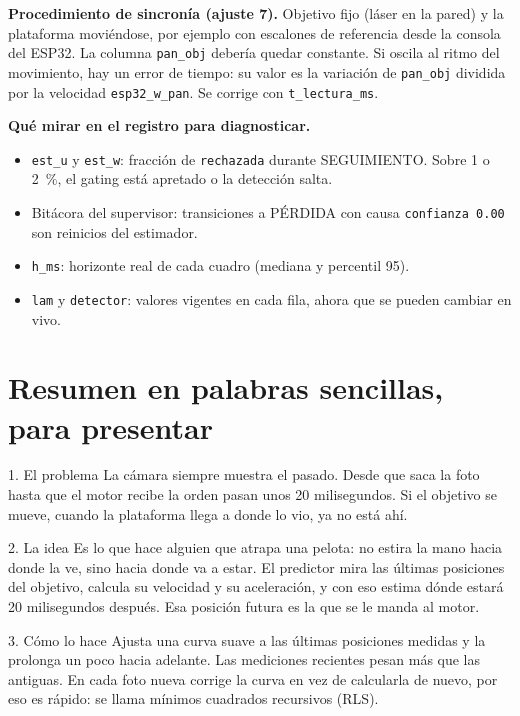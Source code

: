 \documentclass[11pt,a4paper]{article}
\newcommand{\cod}[1]{\texttt{#1}}
\begin{document}
\textbf{Procedimiento de sincronía (ajuste 7).} Objetivo fijo (láser en la pared) y la plataforma moviéndose,
por ejemplo con escalones de referencia desde la consola del ESP32. La columna \cod{pan\_obj} debería quedar
constante. Si oscila al ritmo del movimiento, hay un error de tiempo: su valor es la variación de
\cod{pan\_obj} dividida por la velocidad \cod{esp32\_w\_pan}. Se corrige con \cod{t\_lectura\_ms}.

\textbf{Qué mirar en el registro para diagnosticar.}
\begin{itemize}
  \item \cod{est\_u} y \cod{est\_w}: fracción de \cod{rechazada} durante SEGUIMIENTO. Sobre 1 o 2~\%, el gating
        está apretado o la detección salta.
  \item Bitácora del supervisor: transiciones a PÉRDIDA con causa \cod{confianza 0.00} son reinicios del estimador.
  \item \cod{h\_ms}: horizonte real de cada cuadro (mediana y percentil 95).
  \item \cod{lam} y \cod{detector}: valores vigentes en cada fila, ahora que se pueden cambiar en vivo.
\end{itemize}

\newpage
\section{Resumen en palabras sencillas, para presentar}

\begin{lamina}{1. El problema}
La cámara siempre muestra el pasado. Desde que saca la foto hasta que el motor recibe la orden pasan unos
20 milisegundos. Si el objetivo se mueve, cuando la plataforma llega a donde lo vio, ya no está ahí.
\end{lamina}

\begin{lamina}{2. La idea}
Es lo que hace alguien que atrapa una pelota: no estira la mano hacia donde la ve, sino hacia donde va a
estar. El predictor mira las últimas posiciones del objetivo, calcula su velocidad y su aceleración, y con eso
estima dónde estará 20 milisegundos después. Esa posición futura es la que se le manda al motor.
\end{lamina}

\begin{lamina}{3. Cómo lo hace}
Ajusta una curva suave a las últimas posiciones medidas y la prolonga un poco hacia adelante. Las mediciones
recientes pesan más que las antiguas. En cada foto nueva corrige la curva en vez de calcularla de nuevo, por
eso es rápido: se llama mínimos cuadrados recursivos (RLS).
\end{lamina}
\end{document}

